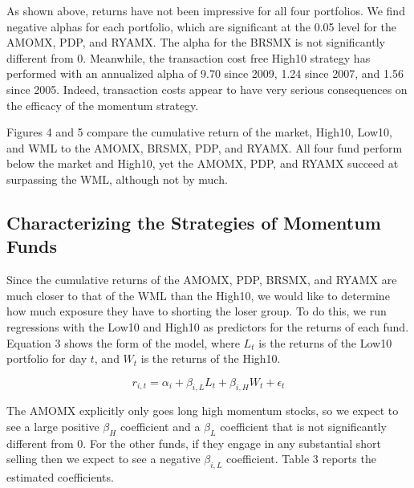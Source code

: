 \documentclass[12pt]{article}
\begin{document}
As shown above, returns have not been impressive for all four portfolios. We find negative alphas for each portfolio, which are significant at the 0.05 level for the AMOMX, PDP, and RYAMX. The alpha for the BRSMX is not significantly different from 0. Meanwhile, the transaction cost free High10 strategy has performed with an annualized alpha of 9.70 since 2009, 1.24 since 2007, and 1.56 since 2005. Indeed, transaction costs appear to have very serious consequences on the efficacy of the momentum strategy.

Figures 4 and 5 compare the cumulative return of the market, High10, Low10, and WML to the AMOMX, BRSMX, PDP, and RYAMX. All four fund perform below the market and High10, yet the AMOMX, PDP, and RYAMX succeed at surpassing the WML, although not by much.

\subsection{Characterizing the Strategies of Momentum Funds}

Since the cumulative returns of the AMOMX, PDP, BRSMX, and RYAMX are much closer to that of the WML than the High10, we would like to determine how much exposure they have to shorting the loser group. To do this, we run regressions with the Low10 and High10 as predictors for the returns of each fund. Equation 3 shows the form of the model, where $L_{t}$ is the returns of the Low10 portfolio for day $t$, and $W_{t}$ is the returns of the High10.

\begin{equation}
r_{i,t}=\alpha_{i}+\beta_{i,L}L_{t}+\beta_{i,H}W_{t}+\epsilon_{t}
\end{equation}

The AMOMX explicitly only goes long high momentum stocks, so we expect to see a large positive $\beta_{H}$ coefficient and a $\beta_{L}$ coefficient that is not significantly different from 0. For the other funds, if they engage in any substantial short selling then we expect to see a negative $\beta_{i,L}$ coefficient. Table 3 reports the estimated coefficients.
\end{document}

